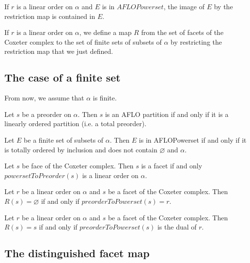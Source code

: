 \begin{sublemma}
If $r$ is a linear order on $\alpha$ and $E$ is in $AFLOPowerset$, the image of $E$ by the restriction map is contained in $E$.

\end{sublemma}

\begin{subdefi}[R]
If $r$ is a linear order on $\alpha$, we define a map $R$ from the set of facets of the Coxeter complex to the set of finite sets of
subsets of $\alpha$ by restricting the restriction map that we just defined.

\end{subdefi}


\subsection{The case of a finite set}

From now, we assume that $\alpha$ is finite.

\begin{sublemma}
Let $s$ be a preorder on $\alpha$. Then $s$ is an AFLO partition if and only if it is a linearly ordered partition (i.e. a total preorder).

\end{sublemma}

\begin{sublemma}
Let $E$ be a finite set of subsets of $\alpha$. Then $E$ is in AFLOPowerset if and only if it is totally ordered by inclusion and does not contain
$\varnothing$ and $\alpha$.

\end{sublemma}

\begin{sublemma}
Let $s$ be face of the Coxeter complex. Then $s$ is a facet if and only $powersetToPreorder(s)$ is a linear order on $\alpha$.

\end{sublemma}

\begin{sublemma}
Let $r$ be a linear order on $\alpha$ and $s$ be a facet of the Coxeter complex. Then $R(s)=\varnothing$ if and only if
$preorderToPowerset(s)=r$.

\end{sublemma}


\begin{sublemma}
Let $r$ be a linear order on $\alpha$ and $s$ be a facet of the Coxeter complex. Then $R(s)=s$ if and only if
$preorderToPowerset(s)$ is the dual of $r$.

\end{sublemma}


\subsection{The distinguished facet map}

